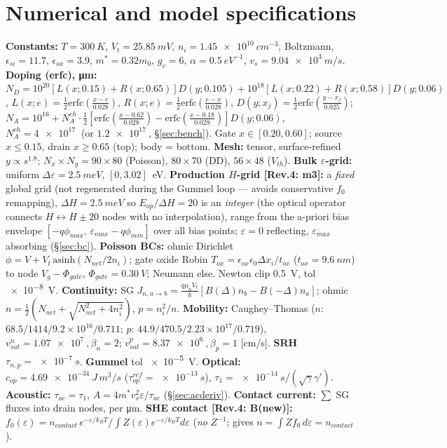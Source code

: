 \documentclass[11pt]{article}
\newcommand{\eps}{\varepsilon}
\newcommand{\fix}[1]{\textcolor{green!45!black}{\small[\textbf{Rev.4:} #1]}}
\begin{document}
\appendix
\section{Numerical and model specifications}\label{sec:specs}
\textbf{Constants:} $T=\SI{300}{K}$, $V_t=\SI{25.85}{mV}$, $n_i=\SI{1.45e10}{cm^{-3}}$,
Boltzmann, $\epsilon_{si}=11.7$, $\epsilon_{ox}=3.9$, $m^*=0.32m_0$, $g_v=6$, $\alpha=
\SI{0.5}{eV^{-1}}$, $v_s=\SI{9.04e3}{m/s}$. \textbf{Doping (erfc), \si{\micro\meter}:}
$N_D=10^{20}[L(x;0.15)+R(x;0.65)]D(y;0.105)+10^{18}[L(x;0.22)+R(x;0.58)]D(y;0.06)$,
$L(x;e)=\tfrac12\mathrm{erfc}(\tfrac{x-e}{0.028})$, $R(x;e)=\tfrac12\mathrm{erfc}
(\tfrac{e-x}{0.028})$, $D(y;x_j)=\tfrac12\mathrm{erfc}(\tfrac{y-x_j}{0.025})$; $N_A=10^{16}+
N_A^{ch}\cdot\tfrac12[\mathrm{erfc}(\tfrac{x-0.62}{0.028})-\mathrm{erfc}(\tfrac{x-0.18}
{0.028})]D(y;0.06)$, $N_A^{ch}=\SI{4e17}{}$ (or $\SI{1.2e17}{}$, \S\ref{sec:bench}). Gate
$x\in[0.20,0.60]$; source $x\le0.15$, drain $x\ge0.65$ (top); body = bottom.
\textbf{Mesh:} tensor, surface-refined $y\propto s^{1.8}$; $N_x{\times}N_y=90{\times}80$
(Poisson), $80{\times}70$ (DD), $56{\times}48$ ($V_{th}$). \textbf{Bulk $\eps$-grid:} uniform
$\Delta\eps=\SI{2.5}{meV}$, $[0,3.02]$~eV. \textbf{Production $H$-grid \fix{m3}:} a
\emph{fixed} global grid (not regenerated during the Gummel loop --- avoids conservative
$f_0$ remapping), $\Delta H=\SI{2.5}{meV}$ so $E_{op}/\Delta H=20$ is an \emph{integer} (the
optical operator connects $H\!\leftrightarrow\!H\pm20$ nodes with no interpolation), range
from the a-priori bias envelope $[-q\phi_{max},\,\eps_{max}-q\phi_{min}]$ over all bias
points; $\eps=0$ reflecting, $\eps_{max}$ absorbing (\S\ref{sec:bc}). \textbf{Poisson BCs:}
ohmic Dirichlet $\phi=V+V_t\,\mathrm{asinh}(N_{net}/2n_i)$; gate oxide Robin
$T_{ox}=\epsilon_{ox}\epsilon_0\Delta x_i/t_{ox}$ ($t_{ox}=\SI{9.6}{nm}$) to node
$V_g-\Phi_{gate}$, $\Phi_{gate}=\SI{0.30}{V}$; Neumann else. Newton clip \SI{0.5}{V}, tol
\SI{e-8}{V}. \textbf{Continuity:} SG $J_{n,a\to b}=\tfrac{q\mu_nV_t}{h}[B(\Delta)n_b-B(-\Delta)
n_a]$; ohmic $n=\tfrac12(N_{net}+\sqrt{N_{net}^2+4n_i^2})$, $p=n_i^2/n$. \textbf{Mobility:}
Caughey--Thomas ($n$: $68.5/1414/9.2{\times}10^{16}/0.711$; $p$: $44.9/470.5/2.23{\times}
10^{17}/0.719$), $v_{sat}^n=\SI{1.07e7}{},\beta_n{=}2$; $v_{sat}^p=\SI{8.37e6}{},\beta_p{=}1$
[cm/s]. \textbf{SRH} $\tau_{n,p}=\SI{e-7}{s}$. \textbf{Gummel} tol \SI{e-5}{V}.
\textbf{Optical:} $c_{op}=\SI{4.69e-34}{J\,m^3/s}$ ($\tau_{op}^{ref}=\SI{e-13}{s}$),
$\tau_1=\SI{e-14}{s}/(\sqrt{\gamma}\gamma')$. \textbf{Acoustic:} $\tau_{ac}=\tau_1$,
$A=4m^*v_s^2\eps/\tau_{ac}$ (\S\ref{sec:acderiv}). \textbf{Contact current:} $\sum$ SG fluxes
into drain nodes, per \si{\micro\meter}. \textbf{SHE contact \fix{B(new)}:}
$f_0(\eps)=n_{contact}\,e^{-\eps/k_BT}/\!\int Z(\eps)e^{-\eps/k_BT}d\eps$ (\emph{no} $Z^{-1}$;
gives $n=\int Zf_0\,d\eps=n_{contact}$).
\end{document}
